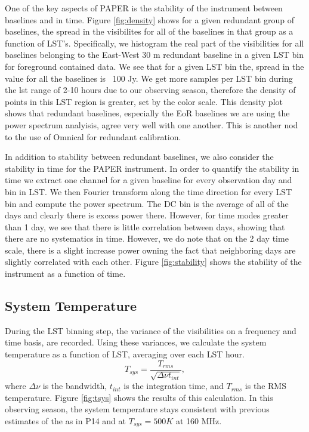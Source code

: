 \documentclass[twocolumn,numberedappendix]{emulateapj} \shorttitle{PSA64}
\begin{document}
One of the key aspects of PAPER is the stability of the instrument between
baselines and in time. Figure \ref{fig:density} shows for a given redundant
group of baselines, the spread in the visibilites for all of the baselines in
that group as a function of LST's. Specifically, we histogram the real part of
the visibilities for all baselines belonging to the East-West 30 m redundant
baseline in a given LST bin for foreground contained data. We see that for a
given LST bin the, spread in the value for all the baselines is ~100 Jy.  We get
more samples per LST bin during the lst range of 2-10 hours due to our observing
season, therefore the density of points in this LST region is greater, set by
the color scale. This density plot shows that redundant baselines, especially
the EoR baselines we are using the power spectrum analyisis, agree very well
with one another. This is another nod to the use of Omnical for redundant
calibration. 

In addition to stability between redundant baselines, we also consider the
stability in time for the PAPER instrument. In order to quantify the stability
in time we extract one channel for a given baseline for every observation day
and bin in LST. We then Fourier transform along the time direction for every LST
bin and compute the power spectrum. The DC bin is the average of all of the days
and clearly there is excess power there. However, for time modes greater than 1
day, we see that there is little correlation between days, showing that there
are no systematics in time. However, we do note that on the 2 day time scale,
there is a slight increase power owning the fact that neighboring days are
slightly correlated with each other.  Figure \ref{fig:stability} shows the
stability of the instrument as a function of time. 

\subsection{System Temperature}   
During the LST binning step, the variance of the visibilities on a frequency and
time basis, are recorded. Using these variances, we calculate the system
temperature as a function of LST, averaging over each LST hour. 
\begin{equation}
    T_{sys} = \frac{T_{rms}}{\sqrt{\Delta\nu t_{int}}}, 
\end{equation}
where $\Delta\nu$ is the bandwidth, $t_{int}$ is the integration time, and
$T_{rms}$ is the RMS temperature.
Figure \ref{fig:tsys} shows the results of this calculation. In this observing
season, the system temperature stays consistent with previous estimates of the
as in P14 and \citet{jacobs_et_al2014} at $T_{sys} =
500K$ at 160 MHz.
\end{document}
